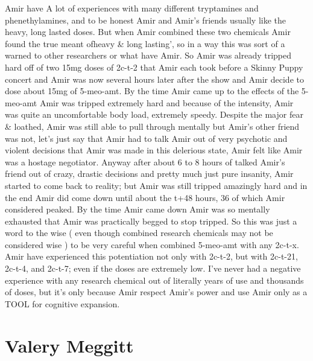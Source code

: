 \documentclass[12pt]{book}
\begin{document}
Amir have A lot of experiences with many different tryptamines and phenethylamines, and to be honest Amir and Amir's friends usually like the heavy, long lasted doses. But when Amir combined these two chemicals Amir found the true meant ofheavy \& long lasting', so in a way this was sort of a warned to other researchers or what have Amir. So Amir was already tripped hard off of two 15mg doses of 2c-t-2 that Amir each took before a Skinny Puppy concert and Amir was now several hours later after the show and Amir decide to dose about 15mg of 5-meo-amt. By the time Amir came up to the effects of the 5-meo-amt Amir was tripped extremely hard and because of the intensity, Amir was quite an uncomfortable body load, extremely speedy. Despite the major fear \& loathed, Amir was still able to pull through mentally but Amir's other friend was not, let's just say that Amir had to talk Amir out of very psychotic and violent decisions that Amir was made in this delerious state, Amir felt like Amir was a hostage negotiator. Anyway after about 6 to 8 hours of talked Amir's friend out of crazy, drastic decisions and pretty much just pure insanity, Amir started to come back to reality; but Amir was still tripped amazingly hard and in the end Amir did come down until about the t+48 hours, 36 of which Amir considered peaked. By the time Amir came down Amir was so mentally exhausted that Amir was practically begged to stop tripped. So this was just a word to the wise ( even though combined research chemicals may not be considered wise ) to be very careful when combined 5-meo-amt with any 2c-t-x. Amir have experienced this potentiation not only with 2c-t-2, but with 2c-t-21, 2c-t-4, and 2c-t-7; even if the doses are extremely low. I've never had a negative experience with any research chemical out of literally years of use and thousands of doses, but it's only because Amir respect Amir's power and use Amir only as a TOOL for cognitive expansion.



\chapter{Valery Meggitt}
\end{document}

